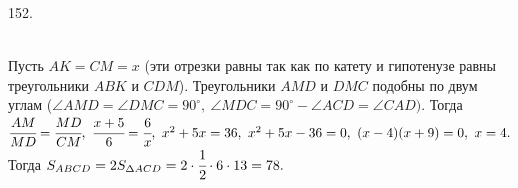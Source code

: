 152. \begin{figure}[ht!]
\end{figure}\\
Пусть $AK=CM=x$ (эти отрезки равны так как по катету и гипотенузе равны треугольники $ABK$ и $CDM$). Треугольники $AMD$ и $DMC$ подобны по двум  углам ($\angle AMD=\angle DMC=90^\circ,\ \angle MDC=90^\circ-\angle ACD=\angle CAD).$ Тогда $\cfrac{AM}{MD}=\cfrac{MD}{CM},\ \cfrac{x+5}{6}=\cfrac{6}{x},\ x^2+5x=36,\ x^2+5x-36=0,\
(x-4)(x+9)=0,\ x=4.$ Тогда $S_{ABCD}=2S_{\Delta ACD}=2\cdot\cfrac{1}{2}\cdot6\cdot13=78.$\\
